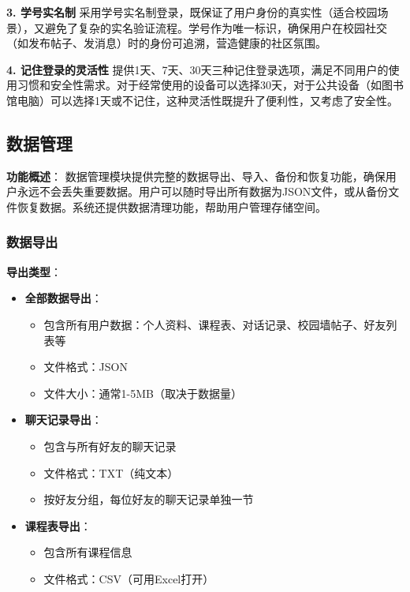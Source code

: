\documentclass[12pt,a4paper]{article}
\begin{document}
\textbf{3. 学号实名制}
采用学号实名制登录，既保证了用户身份的真实性（适合校园场景），又避免了复杂的实名验证流程。学号作为唯一标识，确保用户在校园社交（如发布帖子、发消息）时的身份可追溯，营造健康的社区氛围。

\textbf{4. 记住登录的灵活性}
提供1天、7天、30天三种记住登录选项，满足不同用户的使用习惯和安全性需求。对于经常使用的设备可以选择30天，对于公共设备（如图书馆电脑）可以选择1天或不记住，这种灵活性既提升了便利性，又考虑了安全性。

\subsection{数据管理}

\textbf{功能概述}：
数据管理模块提供完整的数据导出、导入、备份和恢复功能，确保用户永远不会丢失重要数据。用户可以随时导出所有数据为JSON文件，或从备份文件恢复数据。系统还提供数据清理功能，帮助用户管理存储空间。

\subsubsection{数据导出}

\textbf{导出类型}：
\begin{itemize}
    \item \textbf{全部数据导出}：
        \begin{itemize}
            \item 包含所有用户数据：个人资料、课程表、对话记录、校园墙帖子、好友列表等
            \item 文件格式：JSON
            \item 文件大小：通常1-5MB（取决于数据量）
        \end{itemize}
    \item \textbf{聊天记录导出}：
        \begin{itemize}
            \item 包含与所有好友的聊天记录
            \item 文件格式：TXT（纯文本）
            \item 按好友分组，每位好友的聊天记录单独一节
        \end{itemize}
    \item \textbf{课程表导出}：
        \begin{itemize}
            \item 包含所有课程信息
            \item 文件格式：CSV（可用Excel打开）
        \end{itemize}
\end{itemize}
\end{document}
